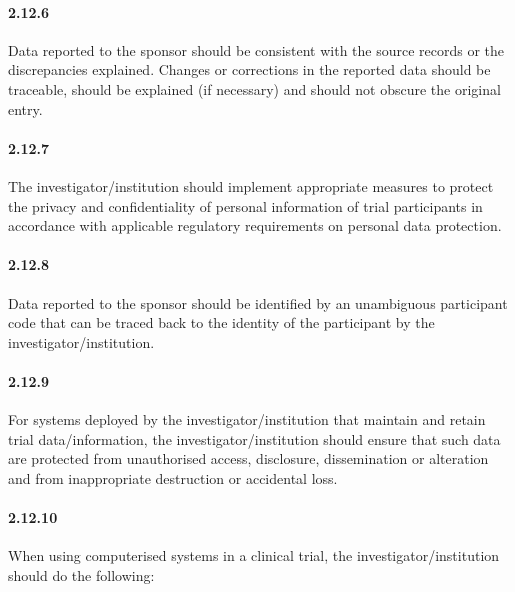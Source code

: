 \documentclass[11pt]{article}
\begin{document}
\paragraph{2.12.6} Data reported to the sponsor should be consistent with the source records or the discrepancies explained. Changes or corrections in the reported data should be traceable, should be explained (if necessary) and should not obscure the original entry.

\paragraph{2.12.7} The investigator/institution should implement appropriate measures to protect the privacy and confidentiality of personal information of trial participants in accordance with applicable regulatory requirements on personal data protection.

\paragraph{2.12.8} Data reported to the sponsor should be identified by an unambiguous participant code that can be traced back to the identity of the participant by the investigator/institution.

\paragraph{2.12.9} For systems deployed by the investigator/institution that maintain and retain trial data/information, the investigator/institution should ensure that such data are protected from unauthorised access, disclosure, dissemination or alteration and from inappropriate destruction or accidental loss.

\paragraph{2.12.10} When using computerised systems in a clinical trial, the investigator/institution should do the following:
\end{document}
